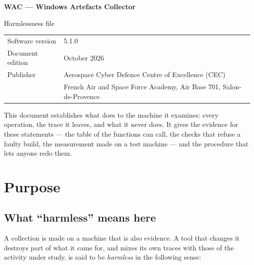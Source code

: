 \documentclass[11pt,a4paper,oneside]{report}
\begin{document}

\thispagestyle{empty}
\vspace*{\fill}
{\color{marine}\Large\bfseries WAC — Windows Artefacts Collector}\par
{\color{bleu}Harmlessness file}\par
\medskip
\begin{tabular}{@{}ll@{}}
Software version & 5.1.0 \\
Document edition & October 2026 \\
Publisher & Aerospace Cyber Defence Centre of Excellence (CEC) \\
          & French Air and Space Force Academy, Air Base 701, Salon-de-Provence \\
\end{tabular}

\bigskip
{\small\color{gris}This document establishes what \wac{} does to the machine
it examines: every operation, the trace it leaves, and what it never does. It
gives the evidence for these statements — the table of the functions
 can call, the checks that refuse a faulty build, the
measurement made on a test machine — and the procedure that lets anyone redo
them.}
\vspace*{2cm}
\clearpage

\tableofcontents

\chapter{Purpose}

\section{What ``harmless'' means here}

A collection is made on a machine that is also evidence. A tool that changes
it destroys part of what it came for, and mixes its own traces with those of
the activity under study. \wac{} is said to be \emph{harmless} in the
following sense:
\end{document}

